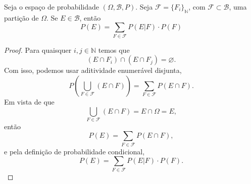 \begin{thm:probabilidade total}
\label{thm:probabilidade total}
Seja o espaço de probabilidade $(\Omega, \mathcal{B}, P)$.
Seja $\mathcal{F} = \{F_i\}_\mathbb{N}$, com $\mathcal{F} \subset \mathcal{B}$, uma partição de
$\Omega$.
Se $E \in \mathcal{B}$, então
\[
	P(E) = \sum_{F \in \mathcal{F}} P(E | F) \cdot P(F)
\]
\begin{proof}
	Para quaisquer $i, j \in \mathbb{N}$ temos que
	\[
		(E \cap F_i) \cap (E \cap F_j)  = \varnothing.
	\]
	Com isso, podemos usar aditividade enumerável disjunta,
	\[
		P\left(\bigcup_{F \in \mathcal{F}} (E \cap F) \right) = \sum_{F \in \mathcal{F}} P(E \cap F).
	\]
	Em vista de que
	\[
		\bigcup_{F \in \mathcal{F}} (E \cap F) = E \cap \Omega = E,
	\]
	então
	\[
		P(E) = \sum_{F \in \mathcal{F}} P(E \cap F),
	\]
	e pela definição de probabilidade condicional,
	\[
		P(E) = \sum_{F \in \mathcal{F}} P(E | F) \cdot P(F).
	\]
\end{proof}
\end{thm:probabilidade total}
